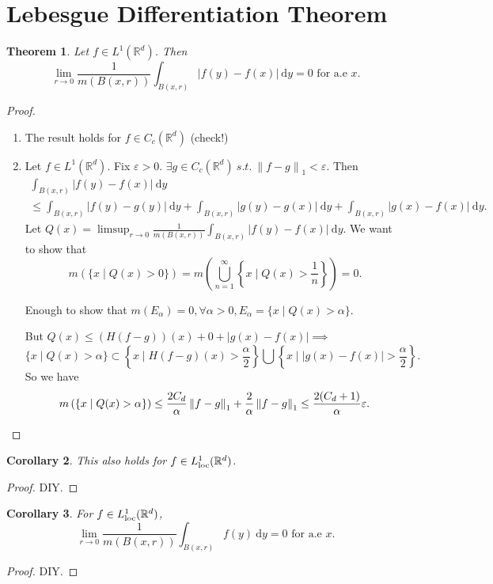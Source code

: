 \documentclass{report}
\newcommand{\R}{\mathbb{R}}
\newcommand{\st}{\ s.t.\ }
\newcommand{\df}{\ \mathrm{d}}
\newcommand{\norm}[1]{\left\| #1 \right\|}
\newtheorem{theorem}{Theorem}[chapter]
\newtheorem{corollary}[theorem]{Corollary}
\theoremstyle{definition}
\theoremstyle{remark}
\begin{document}
\section{Lebesgue Differentiation Theorem}
\begin{theorem}
	Let $f \in L^1(\R^d)$. Then \[\displaystyle \lim_{r \to 0} \frac{1}{m(B(x, r))} \int_{B(x, r)} |f(y) - f(x)| \df y = 0 \text{ for a.e } x.\]
\end{theorem}
\begin{proof}
	\begin{enumerate}
		\item The result holds for $f \in C_c(\R^d)$ (check!)
		\item Let $f \in L^1(\R^d)$. Fix $\varepsilon > 0$. $\exists g \in C_c(\R^d) \st \norm{f - g}_1 < \varepsilon$. Then \begin{multline*}
			\int_{B(x, r)} |f(y) - f(x)| \df y \\
			\leq \int_{B(x, r)}|f(y) - g(y)| \df y + \int_{B(x, r)}|g(y) - g(x)| \df y + \int_{B(x, r)}|g(x) - f(x)| \df y.
		\end{multline*}
		Let $Q(x) = \displaystyle\limsup_{r \to 0}\frac{1}{m(B(x,r))}\int_{B(x, r)}|f(y) - f(x)| \df y$. We want to show that \[m\left(\{x \mid Q(x) > 0\}\right) = m \left(\bigcup_{n=1}^\infty\left\lbrace x \mid Q(x) > \frac{1}{n}\right\rbrace\right) = 0.\]

		Enough to show that $m(E_\alpha) = 0, \forall \alpha > 0, E_\alpha = \{x \mid Q(x) > \alpha\}$.

		But $Q(x) \leq (H(f - g))(x) + 0 + |g(x) - f(x)| \implies$ 
		\[\{x \mid Q(x) > \alpha \} \subset \left\lbrace x \mid H(f - g)(x) > \frac{\alpha}{2}\right\rbrace \bigcup \left\lbrace x \mid |g(x) - f(x)| > \frac{\alpha}{2}\right\rbrace.\]
		So we have 
		\[m\left(\left\lbrace x \mid Q(x) > \alpha \right\rbrace\right) \leq \frac{2C_d}{\alpha} \norm{f - g}_1 + \frac{2}{\alpha}\norm{f - g}_1 \leq \frac{2(C_d + 1)}{\alpha}\varepsilon. \qedhere \]
	\end{enumerate}
\end{proof}

\begin{corollary}
	This also holds for $f \in L^1_{\textup{loc}}(\R^d)$.
\end{corollary}
\begin{proof}
	DIY.
\end{proof}
\begin{corollary}
	For $f \in L^1_{\textup{loc}}(\R^d)$, 
	\[
		\lim_{r \to 0} \frac{1}{m(B(x, r))} \int_{B(x, r)} f(y) \df y = 0 \text{ for a.e }x.
	\]
\end{corollary}
\begin{proof}
	DIY.
\end{proof}
\end{document}

